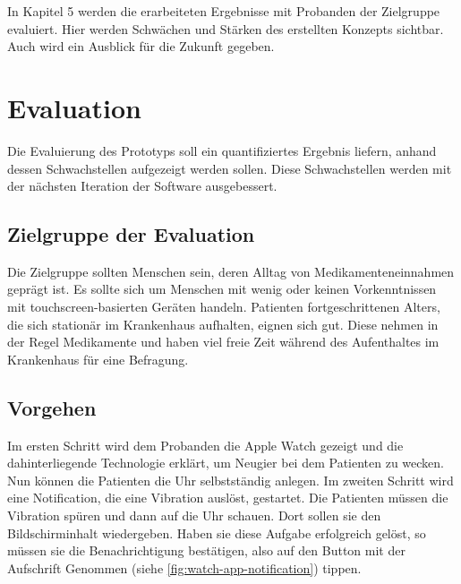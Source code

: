 In Kapitel 5 werden die erarbeiteten Ergebnisse mit Probanden der Zielgruppe evaluiert. Hier werden Schwächen und Stärken des erstellten Konzepts sichtbar. Auch wird ein Ausblick für die Zukunft gegeben.

\section{Evaluation}

Die Evaluierung des Prototyps soll ein quantifiziertes Ergebnis liefern, anhand dessen Schwachstellen aufgezeigt werden sollen. Diese Schwachstellen werden mit der nächsten Iteration der Software ausgebessert.

\subsection{Zielgruppe der Evaluation}
Die Zielgruppe sollten Menschen sein, deren Alltag von Medikamenteneinnahmen geprägt ist. Es sollte sich um Menschen mit wenig oder keinen Vorkenntnissen mit touchscreen-basierten Geräten handeln.  Patienten fortgeschrittenen Alters, die sich stationär im Krankenhaus aufhalten, eignen sich gut. Diese nehmen in der Regel Medikamente und haben viel freie Zeit während des Aufenthaltes im Krankenhaus für eine Befragung.

\subsection{Vorgehen}
Im ersten Schritt wird dem Probanden die Apple Watch gezeigt und die dahinterliegende Technologie erklärt, um Neugier bei dem Patienten zu wecken. Nun können die Patienten die Uhr selbstständig anlegen. 
Im zweiten Schritt wird eine Notification, die eine Vibration auslöst, gestartet. Die Patienten müssen die Vibration spüren und dann auf die Uhr schauen. Dort sollen sie den Bildschirminhalt wiedergeben. Haben sie diese Aufgabe erfolgreich gelöst, so müssen sie die Benachrichtigung bestätigen, also auf den Button mit der Aufschrift \glqq Genommen \grqq (siehe \ref{fig:watch-app-notification}) tippen.

